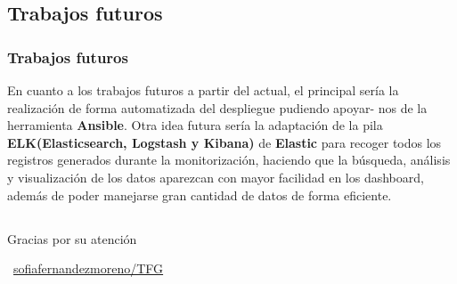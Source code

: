 \documentclass{beamer}
\theoremstyle{plain}
\theoremstyle{definition}
\theoremstyle{plain}
\theoremstyle{definition}
\theoremstyle{remark}
\theoremstyle{definition}
\begin{document}
\subsection{Trabajos futuros}
\begin{frame}
	\frametitle{Trabajos futuros}
En cuanto a los trabajos futuros a partir del actual, el principal
sería la realización de forma automatizada del despliegue pudiendo apoyar-
nos de la herramienta \textbf{Ansible}. Otra idea futura sería la adaptación de la
pila \textbf{ELK(Elasticsearch, Logstash y Kibana)} de \textbf{Elastic} para recoger todos
los registros generados durante la monitorización, haciendo que la búsqueda, análisis y visualización de los datos aparezcan con mayor facilidad en
los dashboard, además de poder manejarse gran cantidad de datos de forma
eficiente.	
\end{frame}
\subsection{}
\begin{frame}{}{}
	\Huge{\centerline{Gracias por su atención}}
	\centerline{\Huge{\raisebox{-.25\height}\faGithub}~\large{\href{https://github.com/sofiafernandezmoreno/TFG}{\alert{sofiafernandezmoreno/TFG}}}}

\end{frame}
\end{document}
